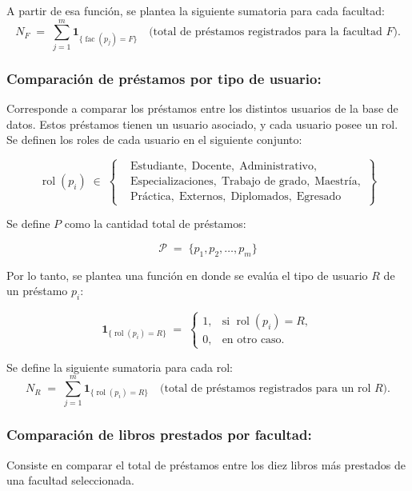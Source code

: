\documentclass[spanish]{ieee_upb}
\begin{document}
A partir de esa función, se plantea la siguiente sumatoria para cada facultad:
\[
  N_F
  \;=\;
  \sum_{j=1}^{m}
    \mathbf 1_{\{\operatorname{fac}(p_j)=F\}}
  \quad
  \bigl(\text{total de préstamos registrados para la facultad }F\bigr).
\]


\subsubsection{Comparación de préstamos por tipo de usuario:}
Corresponde a comparar los préstamos entre los distintos usuarios de la base de datos. Estos préstamos tienen un usuario asociado, y cada usuario posee un rol. Se definen los roles de cada usuario en el siguiente conjunto:

\[
  \operatorname{rol}(p_i)\;\in\;
  \left\{
    \begin{aligned}
      &\text{Estudiante},\;\text{Docente},\;\text{Administrativo},\\
      &\text{Especializaciones},\;\text{Trabajo de grado},\;\text{Maestría},\\
      &\text{Práctica},\;\text{Externos},\;\text{Diplomados},\;\text{Egresado}
    \end{aligned}
  \right\}
\]

\vspace{0.3cm}

Se define \(P\) como la cantidad total de préstamos:

\[
  \mathcal{P}\;=\;\{
      p_1,p_2,\dots,p_m
  \}
\]

Por lo tanto, se plantea una función en donde se evalúa el tipo de usuario \(R\) de un préstamo \(p_i\):

\[
  \mathbf 1_{\{\operatorname{rol}(p_i)=R\}}
  \;=\;
  \begin{cases}
    1, & \text{si } \operatorname{rol}(p_i)=R,\\[4pt]
    0, & \text{en otro caso.}
  \end{cases}
\]

Se define la siguiente sumatoria para cada rol:
\[
  N_R
  \;=\;
  \sum_{j=1}^{m}
    \mathbf 1_{\{\operatorname{rol}(p_i)=R\}}
  \quad
  \bigl(\text{total de préstamos registrados para un rol }R\bigr).
\]


\subsubsection{Comparación de libros prestados por facultad: }
Consiste en comparar el total de préstamos entre los diez libros más prestados de una facultad seleccionada.
\end{document}
